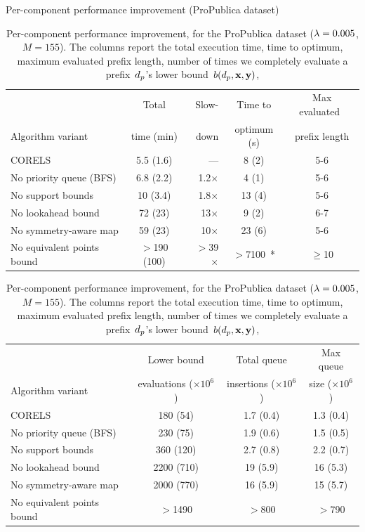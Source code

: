 \begin{table}[t!]
\begin{centering}
Per-component performance improvement (ProPublica dataset) \\
\end{centering}
\vspace{1mm}
\begin{tabular}{l | c  r | c | c}
& Total & Slow- & Time to & Max evaluated~ \\
Algorithm variant & time (min) & down & optimum (s) & prefix length \\
\hline
CORELS & 5.5 (1.6) & --- & 8 (2) & 5-6 \\
No priority queue (BFS) & 6.8 (2.2) & 1.2$\times$ & 4 (1) & 5-6 \\
No support bounds & 10 (3.4) & 1.8$\times$ & 13 (4) & 5-6 \\
No lookahead bound & 72 (23) & 13$\times$ & 9 (2) & 6-7 \\
No symmetry-aware map & 59 (23) & 10$\times$ & 23 (6) & 5-6 \\
No equivalent points bound & $>$190 (100) & $>$39$\times$ & $>$7100~* & $\ge$10 \\
\hline
\end{tabular}
\begin{tabular}{l | c | c | c}
\hline
 & Lower bound & Total queue &  Max queue \\
Algorithm variant & evaluations ($\times 10^6$) & insertions ($\times 10^6$) & size ($\times 10^6$) \\
\hline
CORELS & 180 (54) & 1.7 (0.4) & 1.3 (0.4) \\
No priority queue (BFS) & 230 (75) & 1.9 (0.6) & 1.5 (0.5) \\
No support bounds & 360 (120) & 2.7 (0.8) & 2.2 (0.7) \\
No lookahead bound & 2200 (710) & 19 (5.9) & 16 (5.3) \\
No symmetry-aware map & 2000 (770) & 16 (5.9) & 15 (5.7) \\
No equivalent points bound & $>$1490 & $>$800 & $>$790 \\
\end{tabular}
\caption{Per-component performance improvement, for the ProPublica dataset
(${{\lambda} = 0.005}$, ${M = 155}$).
%
The columns report the total execution time,
time to optimum, maximum evaluated prefix length,
number of times we completely evaluate a prefix~$d_p$'s lower bound~$b(d_p, \mathbf{x}, \mathbf{y})$,
}
\end{table}
